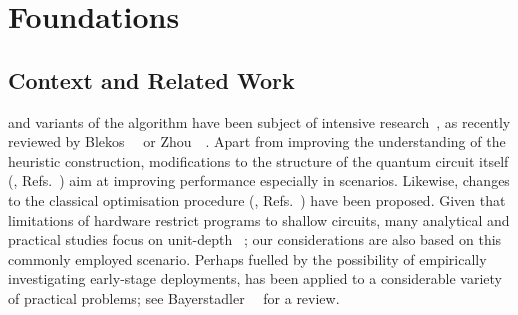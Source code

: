 \section{Foundations}\label{sec:foundations}
\subsection{Context and Related Work}\label{sec:relatedwork}


\QAOA and variants of the algorithm have been subject of intensive 
research~\cite{galda2similarity,fernandez-pendas_study_2022, 
bravyi2020obstacles, Hadfield:2019, akshay2021parameter, 
lotshaw_empirical_2021, Weidenfeller:2022, Alam:2022, Harrigan:2021, 
Herrman:2021, Lee:2021, Medvidovi:2021, Willsch:2020, Wang:2020, 
Bengtsson:2020, Wecker:2016, Jiang:2017, Morales:2020, Lechner:2020, 
Pan:2022, Guerreschi:2019, Gogeissl:2024, Pagano:2020, 
sack2021quantum,Egger:2021,Vijendran:2024, Thelen:2024, Safi:2023, 
Wintersperger:2022, Dupont:2022, schmidbauer:24:reductions, McGeoch:2023, 
Sud:2024, Awasthi:2023,Baertschi:2020, Tate:2023,Fingar:2024,Singhal:2024, 
FernndezPends:2022,PellowJarman:2024,StilckFrana:2021,Shaydulin:2024,Ozaeta:2022}, as recently reviewed 
by Blekos~\etal~\cite{blekos_review_2024} or 
Zhou~\etal~\cite{zhou2020quantum}. Apart from improving the understanding of 
the heuristic construction, modifications to the structure of the quantum 
circuit itself (\eg, Refs.~\cite{Zhang:2017,Wang:2020,Baertschi:2020,
bravyi2020obstacles,zhou2020quantum}) aim at improving
performance especially in \NISQ scenarios. Likewise, changes to the classical 
optimisation procedure (\eg, 
Refs.~\cite{Egger:2021,Awasthi:2023,Tate:2023,Vijendran:2024,Sud:2024,
montanez2024towards,Fingar:2024,streif2020training}) have been proposed.
%
Given that limitations of \NISQ hardware restrict programs to shallow 
circuits, many analytical and practical studies focus on unit-depth 
\QAOA~\cite{farhi2014quantum,bravyi2020obstacles,galda2similarity,blekos_review_2024,fernandez-pendas_study_2022,lotshaw_empirical_2021,Jain:2022,sack2021quantum,Egger:2021,Vijendran:2024,Hadfield:2019}; our considerations are also based
on this commonly employed scenario. Perhaps fuelled by the possibility of empirically investigating early-stage deployments, \QAOA has been applied to a considerable variety of practical problems; see Bayerstadler~\etal~\cite{bayerstadler:21:} for a review.

